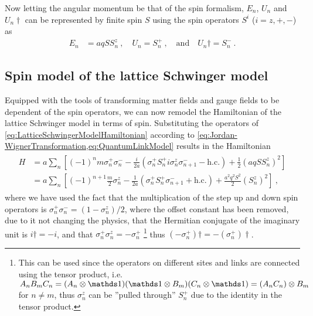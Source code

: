 \documentclass[../main.tex]{subfiles} %
\begin{document}
Now letting the angular momentum be that of the spin formalism, $E_n$, $U_n$ and $U_n\dagger$ can be represented by finite spin $S$ using the spin operators $S^i$ ($i=z,+,-$) as
\begin{align} \label{eq:QuantumLinkModel}
    E_n &= aq S S_n^z \: , \quad
    U_n = S_n^+ \: , \quad \text{and} \quad
    U_n\dagger = S_n^- \: .
\end{align}



\subsection{Spin model of the lattice Schwinger model} \label{sec:SpinModelOfTheLatticeSchwingerModel}

Equipped with the tools of transforming matter fields and gauge fields to be dependent of the spin operators, we can now remodel the Hamiltonian of the lattice Schwinger model in terms of spin. Substituting the operators of \cref{eq:LatticeSchwingerModelHamiltonian} according to \cref{eq:Jordan-WignerTransformation,eq:QuantumLinkModel} results in the Hamiltonian
\begin{align} \label{eq:LatticeSchwingerModelHamiltonianSpin}
\begin{split}
    H &= a \sum_n \left[ (-1)^n m \sigma_n^+ \sigma_n^- - \frac{i}{2a} \left( \sigma_n^+ S_n^+ i \sigma_n^z \sigma_{n+1}^- - \mathrm{h.c.} \right) + \frac{1}{2} \left( aq S S_n^z \right)^2 \right] \\
        &= a \sum_n \left[ (-1)^{n+1} \frac{m}{2} \sigma_n^z - \frac{1}{2a} \left( \sigma_n^+ S_n^+ \sigma_{n+1}^- + \mathrm{h.c.} \right) + \frac{a^2 q^2 S^2}{2} \left( S_n^z \right)^2 \right] \: ,
\end{split}
\end{align}
where we have used the fact that the multiplication of the step up and down spin operators is $\sigma_n^+ \sigma_n^- = (1 - \sigma_n^z)/2$, where the offset constant has been removed, due to it not changing the physics, that the Hermitian conjugate of the imaginary unit is $i\dagger = -i$, and that $\sigma_n^+ \sigma_n^z = -\sigma_n^+$ \footnote{This can be used since the operators on different sites and links are connected using the tensor product, i.e. $A_n B_m C_n = (A_n \otimes \id) (\id \otimes B_m) (C_n \otimes \id) = (A_n C_n) \otimes B_m$ for $n \ne m$, thus $\sigma_n^z$ can be ''pulled through'' $S_n^+$ due to the identity in the tensor product.} thus $(-\sigma_n^+)\dagger = - (\sigma_n^+)\dagger$.
\end{document}
